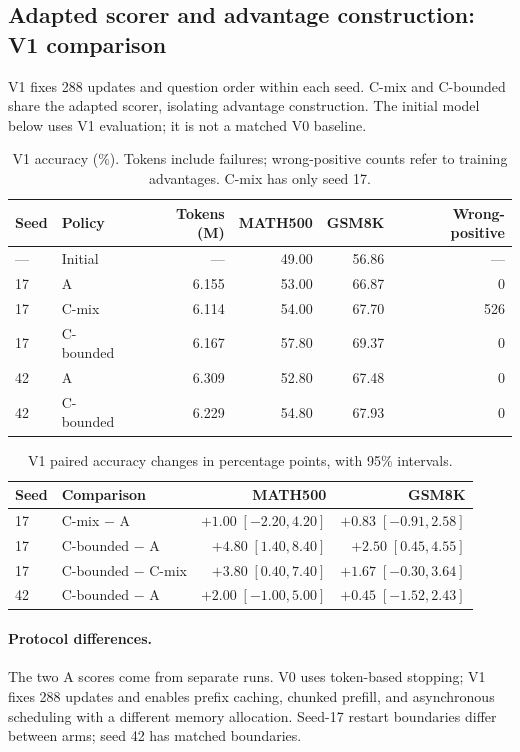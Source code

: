 \documentclass{article}
\begin{document}
\subsection{Adapted scorer and advantage construction: V1 comparison}
V1 fixes 288 updates and question order within each seed. C-mix and C-bounded share the adapted scorer, isolating advantage construction. The initial model below uses V1 evaluation; it is not a matched V0 baseline.

\begin{table}[h!]
\caption{V1 accuracy (\%). Tokens include failures; wrong-positive counts refer to training advantages. C-mix has only seed 17.}
\centering\small
\begin{tabular}{@{}llrrrr@{}}
\toprule
Seed & Policy & Tokens (M) & MATH500 & GSM8K & Wrong-positive \\
\midrule
--- & Initial & --- & 49.00 & 56.86 & --- \\
17 & A & 6.155 & 53.00 & 66.87 & 0 \\
17 & C-mix & 6.114 & 54.00 & 67.70 & 526 \\
17 & C-bounded & 6.167 & 57.80 & 69.37 & 0 \\
42 & A & 6.309 & 52.80 & 67.48 & 0 \\
42 & C-bounded & 6.229 & 54.80 & 67.93 & 0 \\
\bottomrule
\end{tabular}\label{tab:followup}
\end{table}
\begin{table}[h!]
\caption{V1 paired accuracy changes in percentage points, with 95\% intervals.}
\centering\small
\begin{tabular}{@{}llrr@{}}
\toprule
Seed & Comparison & MATH500 & GSM8K \\
\midrule
17 & C-mix $-$ A & $+1.00\;[-2.20,4.20]$ & $+0.83\;[-0.91,2.58]$ \\
17 & C-bounded $-$ A & $+4.80\;[1.40,8.40]$ & $+2.50\;[0.45,4.55]$ \\
17 & C-bounded $-$ C-mix & $+3.80\;[0.40,7.40]$ & $+1.67\;[-0.30,3.64]$ \\
42 & C-bounded $-$ A & $+2.00\;[-1.00,5.00]$ & $+0.45\;[-1.52,2.43]$ \\
\bottomrule
\end{tabular}\label{tab:paired}
\end{table}

\paragraph{Protocol differences.}
The two A scores come from separate runs. V0 uses token-based stopping; V1 fixes 288 updates and enables prefix caching, chunked prefill, and asynchronous scheduling with a different memory allocation. Seed-17 restart boundaries differ between arms; seed 42 has matched boundaries.
\end{document}
